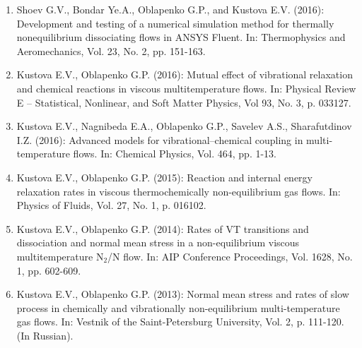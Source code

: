 \documentclass{resume} %
\begin{document}
\begin{enumerate}
\item  {Shoev G.V., Bondar Ye.A., {Oblapenko G.P.}, and Kustova E.V.} (2016): Development and testing of a numerical simulation method for thermally nonequilibrium dissociating flows in ANSYS Fluent. In: Thermophysics and Aeromechanics, Vol. 23, No. 2, pp. 151-163.

\item {Kustova E.V., {Oblapenko G.P.}} (2016): Mutual effect of vibrational relaxation and chemical reactions in viscous multitemperature flows. In: Physical Review E -- Statistical, Nonlinear, and Soft Matter Physics, Vol 93, No. 3, p. 033127.

\item  {Kustova E.V., Nagnibeda E.A., {Oblapenko G.P.}, Savelev A.S., Sharafutdinov I.Z.} (2016): Advanced models for vibrational–chemical coupling in multi-temperature flows. In: Chemical Physics, Vol. 464, pp. 1-13.

\item {Kustova E.V., {Oblapenko G.P.}} (2015): Reaction and internal energy relaxation rates in viscous thermochemically non-equilibrium gas flows. In: Physics of Fluids, Vol. 27, No. 1, p. 016102.

\item  {Kustova E.V., {Oblapenko G.P.}} (2014): Rates of VT transitions and dissociation and normal mean stress in a non-equilibrium viscous multitemperature N$_2$/N flow. In: AIP Conference Proceedings, Vol. 1628, No. 1, pp. 602-609.

\item  {Kustova E.V., {Oblapenko G.P.}} (2013):
{Normal mean stress and rates of slow process in chemically and vibrationally non-equilibrium multi-temperature gas flows.} In: Vestnik of the Saint-Petersburg University, Vol. 2, p. 111-120. (In Russian).
\end{enumerate}
\end{document}
